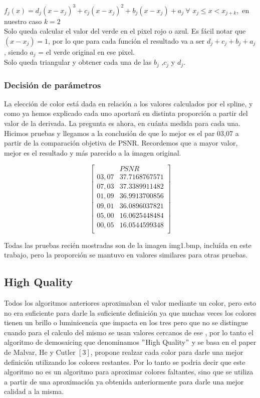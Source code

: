 $f_j(x) = d_j(x-x_j)^3 + c_j(x-x_j)^2 + b_j(x-x_j) + a_j\ \forall$ $x_j \leq x < x_{j+k}$,\ en nuestro caso $k = 2$ \\

Solo queda calcular el valor del verde en el pixel rojo o azul.
Es fácil notar que $(x-x_j) = 1$, por lo que para cada función el resultado va a ser $d_j+c_j+b_j+a_j$, siendo $a_j$ = el verde original en ese pixel.\\
Solo queda triangular y obtener cada una de las $b_j$ ,$c_j$ y $d_j$.\\

\subsubsection{Decisión de parámetros}
La elección de color está dada en relación a los valores calculados por el spline, y como ya hemos explicado cada uno aportará en distinta proporción a partir del valor de la derivada. La pregunta es ahora, en cuánta medida para cada una. Hicimos pruebas y llegamos a la conclusión de que lo mejor es el par 03,07 a partir de la comparación objetiva de PSNR. Recordemos que a mayor valor, mejor es el resultado y más parecido a la imagen original.

$$ 
\begin{bmatrix}
           &          PSNR          \\
       03,07   &      37.7168767571 \\
       07,03   &      37.3389911482 \\
       01,09   &      36.9913700856 \\
       09,01   &      36.0896037821 \\
       05,00   &      16.0625448484 \\       
       00,05   &      16.0544599348 \\
\end{bmatrix} 
$$

Todas las pruebas recién mostradas son de la imagen img1.bmp, incluída en este trabajo, pero la proporción se mantuvo en valores similares para otras pruebas.

\subsection{High Quality}

Todos los algoritmos anteriores aproximaban el valor mediante un color, pero esto no era suficiente para darle la suficiente definición ya que muchas veces los colores tienen un brillo o luminicencia que impacta en los tres pero que no se distingue cuando para el calculo del mismo se usan valores cercanos de ese , por lo tanto el algoritmo de demosaicing que denominamos $"$High Quality$"
$ y se basa en el paper de Malvar, He y Cutler $[3]$, propone realzar cada color para darle una mejor definición utilizando los colores restantes. Por lo tanto se podria decir que este algoritmo no es un algoritmo para aproximar colores faltantes, sino que se utiliza a partir de una aproximación ya obtenida anteriormente para darle una mejor calidad a la misma.

